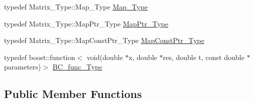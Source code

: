 \begin{DoxyCompactItemize}
typedef Matrix\+\_\+\+Type\+::\+Map\+\_\+\+Type \hyperlink{classFEDD_1_1FE__Test_a416d3abf702e778eb7fab3cd1feb3ede}{Map\+\_\+\+Type}
\item 
typedef Matrix\+\_\+\+Type\+::\+Map\+Ptr\+\_\+\+Type \hyperlink{classFEDD_1_1FE__Test_af41d3f3475a5ac2e0c7d3aab1b06102b}{Map\+Ptr\+\_\+\+Type}
\item 
typedef Matrix\+\_\+\+Type\+::\+Map\+Const\+Ptr\+\_\+\+Type \hyperlink{classFEDD_1_1FE__Test_ad09d94cdf8e7574fc9b6d1648fa18826}{Map\+Const\+Ptr\+\_\+\+Type}
\item 
typedef boost\+::function$<$ void(double $\ast$x, double $\ast$res, double t, const double $\ast$parameters)$>$ \hyperlink{classFEDD_1_1FE__Test_a1ac70a79e5935320b05ecf16739ad8a4}{B\+C\+\_\+func\+\_\+\+Type}
\end{DoxyCompactItemize}
\subsection*{Public Member Functions}
